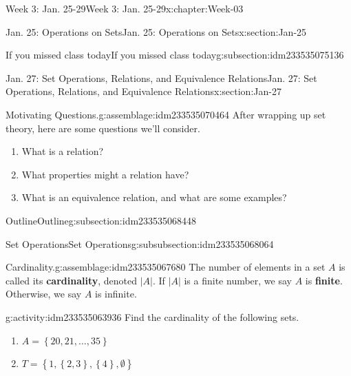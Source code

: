 \documentclass[oneside,10pt,]{book}
\newcommand{\terminology}[1]{\textbf{#1}}
\numberwithin{equation}{section}
\newcommand{\set}[1]{\left\{ {#1} \right\}}
\newcommand{\card}[1]{\left| #1 \right|}
\begin{document}
\begin{chapterptx}{Week 3: Jan. 25-29}{}{Week 3: Jan. 25-29}{}{}{x:chapter:Week-03}
\begin{sectionptx}{Jan. 25: Operations on Sets}{}{Jan. 25: Operations on Sets}{}{}{x:section:Jan-25}
\begin{subsectionptx}{If you missed class today}{}{If you missed class today}{}{}{g:subsection:idm233535075136}
\end{subsectionptx}
\end{sectionptx}
%
%
\typeout{************************************************}
\typeout{************************************************}
%
\begin{sectionptx}{Jan. 27: Set Operations, Relations, and Equivalence Relations}{}{Jan. 27: Set Operations, Relations, and Equivalence Relations}{}{}{x:section:Jan-27}
\begin{introduction}{}%
\begin{assemblage}{Motivating Questions.}{g:assemblage:idm233535070464}%
After wrapping up set theory, here are some questions we'll consider. %
\begin{enumerate}
\item{}What is a relation?%
\item{}What properties might a relation have?%
\item{}What is an equivalence relation, and what are some examples?%
\end{enumerate}
%
\end{assemblage}
\end{introduction}%
%
%
\typeout{************************************************}
\typeout{************************************************}
%
\begin{subsectionptx}{Outline}{}{Outline}{}{}{g:subsection:idm233535068448}
%
%
\typeout{************************************************}
\typeout{************************************************}
%
\begin{subsubsectionptx}{Set Operations}{}{Set Operations}{}{}{g:subsubsection:idm233535068064}
\begin{assemblage}{Cardinality.}{g:assemblage:idm233535067680}%
The number of elements in a set \(A\) is called its \terminology{cardinality}, denoted \(\card{A}\). If \(\card{A}\) is a finite number, we say \(A\) is \terminology{finite}. Otherwise, we say \(A\) is infinite.%
\end{assemblage}
\begin{activity}{}{g:activity:idm233535063936}%
Find the cardinality of the following sets.%
%
\begin{enumerate}
\item{}\(\displaystyle A=\set{20, 21, \ldots, 35}\)%
\item{}\(\displaystyle T = \set{1,\set{2,3},\set{4},\emptyset}\)%

\end{enumerate}
\end{activity}
\end{subsubsectionptx}
\end{subsectionptx}
\end{sectionptx}
\end{chapterptx}
\end{document}

